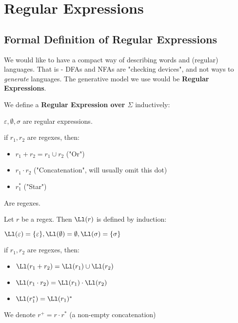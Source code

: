\newpage
\section{Regular Expressions}
\subsection{Formal Definition of Regular Expressions}
We would like to have a compact way of describing words and (regular) languages. That is - DFAs and NFAs are "checking devices", and not ways to \textit{generate} languages.  The generative model we use would be \textbf{Regular Expressions}.
\begin{yellowBox}
	\begin{defn}
		 We define a \textbf{Regular Expression over $\Sigma$} inductively:
		\begin{mythrm}
			[Base:] $\varepsilon, \emptyset, \sigma$ are regular expressions.
		\end{mythrm}
		\begin{mythrm}
			[Step:] if $r_1, r_2$ are regexes, then:\begin{itemize}
				\item $r_1 + r_2 = r_1\cup r_2 $ ("Or")
				\item $r_1\cdot r_2$ ("Concatenation", will usually omit this dot)
				\item$r_1^*$ ("Star")
			\end{itemize}
			Are regexes.
		\end{mythrm}
	\end{defn}
	\begin{defn}
		 Let $r$ be a regex. Then $\Ll(r)$ is defined by induction:
		\begin{mythrm}
			[Base:] $\Ll(\varepsilon)=\{\varepsilon\}, \Ll(\emptyset) = \emptyset,\Ll(\sigma)= \{\sigma\}$
		\end{mythrm}
		\begin{mythrm}
			[Step:] if $r_1, r_2$ are regexes, then:\begin{itemize}
				\item $\Ll(r_1 + r_2) = \Ll(r_1) \cup\Ll(r_2)$
				\item $\Ll(r_1\cdot r_2) = \Ll(r_1 ) \cdot \Ll(r_2)$
				\item$\Ll(r_1^*) = \Ll(r_1)^*$
				
			\end{itemize}
		\end{mythrm}
	\end{defn}
	\begin{remark}
		We denote $r^+ = r\cdot r^*$ (a non-empty concatenation)
	\end{remark}
\end{yellowBox}
